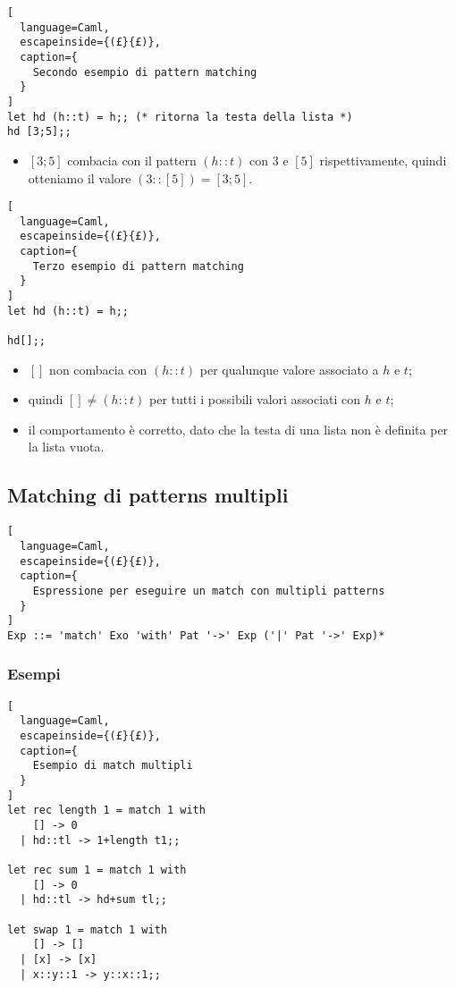 \begin{lstlisting}[
  language=Caml,
  escapeinside={(£}{£)},
  caption={
    Secondo esempio di pattern matching
  }
]
let hd (h::t) = h;; (* ritorna la testa della lista *)
hd [3;5];;
\end{lstlisting}
\begin{itemize}
  \item $[3;5]$ combacia con il pattern $(h::t)$ con $3$ e $[5]$
    rispettivamente, quindi otteniamo il valore $(3::[5])=[3;5]$.
\end{itemize}

\begin{lstlisting}[
  language=Caml,
  escapeinside={(£}{£)},
  caption={
    Terzo esempio di pattern matching
  }
]
let hd (h::t) = h;;

hd[];;
\end{lstlisting}
\begin{itemize}
  \item $[]$ non combacia con $(h::t)$ per qualunque valore associato a $h$ e
    $t$;
  \item quindi $[]\neq(h::t)$ per tutti i possibili valori associati con $h$ e
    $t$;
  \item il comportamento è corretto, dato che la testa di una lista non è
    definita per la lista vuota.
\end{itemize}

\subsection{Matching di patterns multipli}
\begin{lstlisting}[
  language=Caml,
  escapeinside={(£}{£)},
  caption={
    Espressione per eseguire un match con multipli patterns
  }
]
Exp ::= 'match' Exo 'with' Pat '->' Exp ('|' Pat '->' Exp)*
\end{lstlisting}

\subsubsection{Esempi}
\begin{lstlisting}[
  language=Caml,
  escapeinside={(£}{£)},
  caption={
    Esempio di match multipli
  }
]
let rec length 1 = match 1 with
    [] -> 0
  | hd::tl -> 1+length t1;;

let rec sum 1 = match 1 with
    [] -> 0
  | hd::tl -> hd+sum tl;;

let swap 1 = match 1 with
    [] -> []
  | [x] -> [x]
  | x::y::1 -> y::x::1;;
\end{lstlisting}

